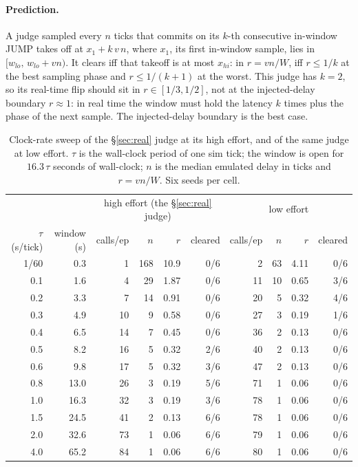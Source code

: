 \documentclass[11pt]{article}
\begin{document}
\paragraph{Prediction.} A judge sampled every $n$ ticks that commits on its
$k$-th consecutive in-window JUMP takes off at $x_1 + k\,v\,n$, where $x_1$,
its first in-window sample, lies in $[w_{lo},\, w_{lo} + vn)$. It clears iff
that takeoff is at most $x_{hi}$: in $r = vn/W$, iff $r \le 1/k$ at the best
sampling phase and $r \le 1/(k+1)$ at the worst. This judge has $k = 2$, so
its real-time flip should sit in $r \in [1/3, 1/2]$, not at the
injected-delay boundary $r \approx 1$: in real time the window must hold the
latency $k$ times plus the phase of the next sample. The injected-delay
boundary is the best case.

\begin{table}[h]
  \centering
  \caption{Clock-rate sweep of the \S\ref{sec:real} judge at its high
  effort, and of the same judge at low effort. $\tau$ is the wall-clock
  period of one sim tick; the window is open for $16.3\,\tau$ seconds of
  wall-clock; $n$ is the median emulated delay in ticks and $r = vn/W$. Six
  seeds per cell.}
  \label{tab:clock}
  \begin{tabular}{rr|rrrr|rrrr}
    \toprule
    & & \multicolumn{4}{c|}{high effort (the \S\ref{sec:real} judge)} & \multicolumn{4}{c}{low effort} \\
    $\tau$ (s/tick) & window (s) & calls/ep & $n$ & $r$ & cleared & calls/ep & $n$ & $r$ & cleared \\
    \midrule
    1/60 & 0.3  & 1  & 168 & 10.9 & 0/6 & 2  & 63 & 4.11 & 0/6 \\
    0.1  & 1.6  & 4  & 29  & 1.87 & 0/6 & 11 & 10 & 0.65 & 3/6 \\
    0.2  & 3.3  & 7  & 14  & 0.91 & 0/6 & 20 & 5  & 0.32 & 4/6 \\
    0.3  & 4.9  & 10 & 9   & 0.58 & 0/6 & 27 & 3  & 0.19 & 1/6 \\
    0.4  & 6.5  & 14 & 7   & 0.45 & 0/6 & 36 & 2  & 0.13 & 0/6 \\
    0.5  & 8.2  & 16 & 5   & 0.32 & 2/6 & 40 & 2  & 0.13 & 0/6 \\
    0.6  & 9.8  & 17 & 5   & 0.32 & 3/6 & 47 & 2  & 0.13 & 0/6 \\
    0.8  & 13.0 & 26 & 3   & 0.19 & 5/6 & 71 & 1  & 0.06 & 0/6 \\
    1.0  & 16.3 & 32 & 3   & 0.19 & 3/6 & 78 & 1  & 0.06 & 0/6 \\
    1.5  & 24.5 & 41 & 2   & 0.13 & 6/6 & 78 & 1  & 0.06 & 0/6 \\
    2.0  & 32.6 & 73 & 1   & 0.06 & 6/6 & 79 & 1  & 0.06 & 0/6 \\
    4.0  & 65.2 & 84 & 1   & 0.06 & 6/6 & 80 & 1  & 0.06 & 0/6 \\
    \bottomrule
  \end{tabular}
\end{table}
\end{document}
